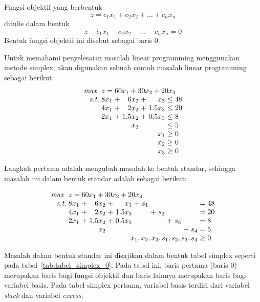 Fungsi objektif yang berbentuk
\begin{equation*}
	z = c_1x_1 + c_2x_2 + \dots + c_nx_n
\end{equation*}
ditulis dalam bentuk
\begin{equation*}
	z - c_1x_1 - c_2x_2 - \dots - c_nx_n = 0
\end{equation*}
Bentuk fungsi objektif ini disebut sebagai baris 0.

Untuk memahami penyelesaian masalah linear programming menggunakan metode simplex, akan digunakan sebuah contoh masalah linear programming sebagai berikut:
\begin{equation*}
	\setlength\arraycolsep{1.5pt}
	\begin{array}{r r c r c r c l}
		\textit{max } &\multicolumn{7}{l}{z = 60x_1 + 30x_2 + 20x_3}\\
		\textit{s.t.} &8x_1 &+ &6x_2 &+ &x_3 &\leq &48\\
		&4x_1 &+ &2x_2 &+ &1.5x_3 &\leq &20\\
		&2x_1 &+ &1.5x_2 &+ &0.5x_3 &\leq &8\\
		&&&x_2 &&&\leq &5\\
		&&&&&x_1 &\geq &0\\
		&&&&&x_2 &\geq &0\\
		&&&&&x_3 &\geq &0\\
	\end{array}
\end{equation*}

Langkah pertama adalah mengubah masalah ke bentuk standar, sehingga masalah ini dalam bentuk standar adalah sebagai berikut:

\begin{equation*}
	\setlength\arraycolsep{1.5pt}
	\begin{array}{r r c r c r c r c r c r c r c l}
		\textit{max } &\multicolumn{15}{l}{z = 60x_1 + 30x_2 + 20x_3}\\
		\textit{s.t.} &8x_1 &+ &6x_2 &+ &x_3 &+ &s_1 &&&&&&&= &48\\
		&4x_1 &+ &2x_2 &+ &1.5x_3 &&&+ &s_2 &&&&&= &20\\
		&2x_1 &+ &1.5x_2 &+ &0.5x_3 &&&&&+ &s_3 &&&= &8\\
		&&&x_2 && &&&&&&&+ &s_4 &= &5\\
		\multicolumn{14}{r}{x_1, x_2, x_3, s_1, s_2, s_3, s_4} &\geq &0\\
	\end{array}
\end{equation*}

Masalah dalam bentuk standar ini disajikan dalam bentuk tabel simplex seperti pada tabel~\ref{tab:tabel_simplex_0}. Pada tabel ini, baris pertama (baris 0) merupakan baris bagi fungsi objektif dan baris lainnya merupakan baris bagi variabel basis. Pada tabel simplex pertama, variabel basis terdiri dari variabel \textit{slack} dan variabel \textit{excess}.

